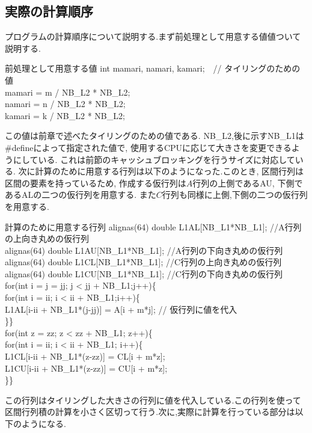 \documentclass[11pt,a4paper]{jsreport}
\theoremstyle{definition}
\begin{document}
\subsection{実際の計算順序}
	プログラムの計算順序について説明する.まず前処理として用意する値値ついて説明する.
\begin{itembox}[l]{前処理として用意する値}
int mamari, namari, kamari;　// タイリングのための値 \\
mamari = m / NB\_L2 * NB\_L2; \\
namari = n / NB\_L2 * NB\_L2; \\
kamari = k / NB\_L2 * NB\_L2; \\
\end{itembox}
この値は前章で述べたタイリングのための値である. NB\_L2,後に示すNB\_L1は\#defineによって指定された値で, 使用するCPUに応じて大きさを変更できるようにしている. これは前節のキャッシュブロッキングを行うサイズに対応している. 次に計算のために用意する行列は以下のようになった.このとき, 区間行列は区間の要素を持っているため, 作成する仮行列は$A$行列の上側であるAU, 下側であるALの二つの仮行列を用意する. また$C$行列も同様に上側,下側の二つの仮行列を用意する.
\begin{itembox}[l]{計算のために用意する行列}
alignas(64) double L1AL[NB\_L1*NB\_L1]; //A行列の上向き丸めの仮行列 \\
alignas(64) double L1AU[NB\_L1*NB\_L1]; //A行列の下向き丸めの仮行列 \\
alignas(64) double L1CL[NB\_L1*NB\_L1]; //C行列の上向き丸めの仮行列 \\
alignas(64) double L1CU[NB\_L1*NB\_L1]; //C行列の下向き丸めの仮行列 \\
for(int i = j = jj; j < jj + NB\_L1;j++)\{ \\
	for(int i = ii; i < ii + NB\_L1;i++)\{ \\
		L1AL[i-ii + NB\_L1*(j-jj)] = A[i + m*j]; // 仮行列に値を代入 \\
	\}\} \\
for(int z = zz; z < zz + NB\_L1; z++)\{ \\
                for(int i = ii; i < ii + NB\_L1; i++)\{ \\
                    L1CL[i-ii + NB\_L1*(z-zz)] = CL[i + m*z]; \\
                    L1CU[i-ii + NB\_L1*(z-zz)] = CU[i + m*z]; \\
               \}\}
\end{itembox}
この行列はタイリングした大きさの行列に値を代入している.この行列を使って区間行列積の計算を小さく区切って行う.次に,実際に計算を行っている部分は以下のようになる.
\end{document}
